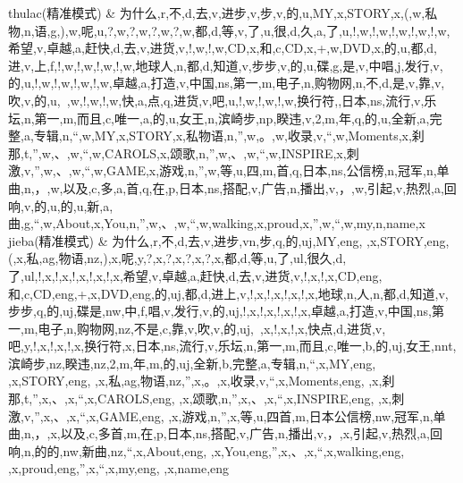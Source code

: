 thulac(精准模式) & 为什么,r,不,d,去,v,进步,v,步,v,的,u,MY,x,STORY,x,(,w,私物,n,语,g,),w,呢,u,?,w,?,w,?,w,?,w,都,d,等,v,了,u,很,d,久,a,了,u,!,w,!,w,!,w,!,w,!,w,希望,v,卓越,a,赶快,d,去,v,进货,v,!,w,!,w,CD,x,和,c,CD,x,+,w,DVD,x,的,u,都,d,进,v,上,f,!,w,!,w,!,w,!,w,地球人,n,都,d,知道,v,步步,v,的,u,碟,g,是,v,中唱,j,发行,v,的,u,!,w,!,w,!,w,!,w,卓越,a,打造,v,中国,ns,第一,m,电子,n,购物网,n,不,d,是,v,靠,v,吹,v,的,u,~,w,!,w,!,w,快,a,点,q,进货,v,吧,u,!,w,!,w,!,w,换行符,,日本,ns,流行,v,乐坛,n,第一,m,而且,c,唯一,a,的,u,女王,n,滨崎步,np,睽违,v,2,m,年,q,的,u,全新,a,完整,a,专辑,n,“,w,MY,x,STORY,x,私物语,n,”,w,。,w,收录,v,“,w,Moments,x,刹那,t,”,w,、,w,“,w,CAROLS,x,颂歌,n,”,w,、,w,“,w,INSPIRE,x,刺激,v,”,w,、,w,“,w,GAME,x,游戏,n,”,w,等,u,四,m,首,q,日本,ns,公信榜,n,冠军,n,单曲,n,，,w,以及,c,多,a,首,q,在,p,日本,ns,搭配,v,广告,n,播出,v,，,w,引起,v,热烈,a,回响,v,的,u,的,u,新,a,曲,g,“,w,About,x,You,n,”,w,、,w,“,w,walking,x,proud,x,”,w,“,w,my,n,name,x\\
jieba(精准模式) & 为什么,r,不,d,去,v,进步,vn,步,q,的,uj,MY,eng, ,x,STORY,eng,(,x,私,ag,物语,nz,),x,呢,y,?,x,?,x,?,x,?,x,都,d,等,u,了,ul,很久,d,了,ul,!,x,!,x,!,x,!,x,!,x,希望,v,卓越,a,赶快,d,去,v,进货,v,!,x,!,x,CD,eng,和,c,CD,eng,+,x,DVD,eng,的,uj,都,d,进上,v,!,x,!,x,!,x,!,x,地球,n,人,n,都,d,知道,v,步步,q,的,uj,碟是,nw,中,f,唱,v,发行,v,的,uj,!,x,!,x,!,x,!,x,卓越,a,打造,v,中国,ns,第一,m,电子,n,购物网,nz,不是,c,靠,v,吹,v,的,uj,~,x,!,x,!,x,快点,d,进货,v,吧,y,!,x,!,x,!,x,换行符,x,日本,ns,流行,v,乐坛,n,第一,m,而且,c,唯一,b,的,uj,女王,nnt,滨崎步,nz,睽违,nz,2,m,年,m,的,uj,全新,b,完整,a,专辑,n,“,x,MY,eng, ,x,STORY,eng, ,x,私,ag,物语,nz,”,x,。,x,收录,v,“,x,Moments,eng, ,x,刹那,t,”,x,、,x,“,x,CAROLS,eng, ,x,颂歌,n,”,x,、,x,“,x,INSPIRE,eng, ,x,刺激,v,”,x,、,x,“,x,GAME,eng, ,x,游戏,n,”,x,等,u,四首,m,日本公信榜,nw,冠军,n,单曲,n,，,x,以及,c,多首,m,在,p,日本,ns,搭配,v,广告,n,播出,v,，,x,引起,v,热烈,a,回响,n,的的,nw,新曲,nz,“,x,About,eng, ,x,You,eng,”,x,、,x,“,x,walking,eng, ,x,proud,eng,”,x,“,x,my,eng, ,x,name,eng\\
\hline
